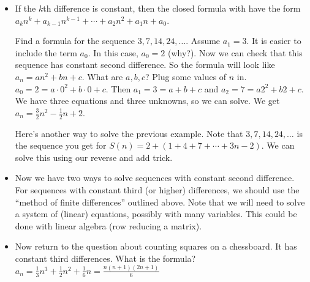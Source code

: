 \begin{itemize}
\item If the $k$th difference is constant, then the closed formula with have the form $a_k n^k + a_{k-1} n^{k-1} +\cdots + a_2 n^2 + a_1 n + a_0$.

\ex Find a formula for the sequence $3, 7, 14, 24,\ldots$. Assume $a_1 = 3$.  It is easier to include the term $a_0$.  In this case, $a_0 = 2$ (why?).  Now we can check that this sequence has constant second difference.  So the formula will look like $a_n = a n^2 + b n + c$.  What are $a, b, c$?  Plug some values of $n$ in. $a_0 = 2 = a\cdot 0^2 + b \cdot 0 + c$.  Then $a_1 = 3 = a + b + c$ and $a_2 = 7 = a2^2 + b 2 + c$.  We have three equations and three unknowns, so we can solve.  We get $a_n = \frac{3}{2} n^2 - \frac{1}{2}n + 2$.

\ex Here's another way to solve the previous example.  Note that $3, 7, 14, 24,\ldots$ is the sequence you get for $S(n) = 2 + (1 + 4 + 7 + \cdots + 3n - 2)$.  We can solve this using our reverse and add trick.  

\item Now we have two ways to solve sequences with constant second difference.  For sequences with constant third (or higher) differences, we should use the ``method of finite differences'' outlined above.  Note that we will need to solve a system of (linear) equations, possibly with many variables.  This could be done with linear algebra (row reducing a matrix).

\item Now return to the question about counting squares on a chessboard.  It has constant third differences.  What is the formula? $a_n = \frac{1}{3}n^3 + \frac{1}{2}n^2 + \frac{1}{6}n = \frac{n(n+1)(2n+1)}{6}$

\end{itemize}



